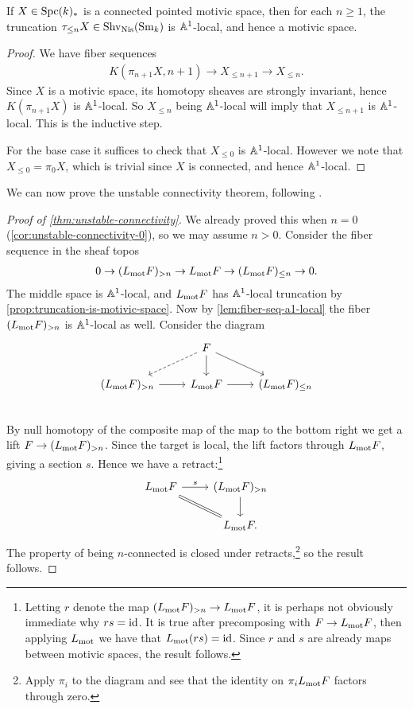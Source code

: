 \documentclass[11pt,openany]{book}
\begin{document}
\begin{proposition}\label{prop:truncation-is-motivic-space} 
\cite[1.8(2)]{bachmannstrongly}
If $X \in \mathrm{Spc}(k)_\ast$ is a connected pointed motivic space, then for each $n\ge 1$, the truncation $\tau_{\le n}X \in \mathrm{Shv}_{\mathrm{Nis}}(\mathrm{Sm}_k)$ is $\mathbb{A}^1$-local, and hence a motivic space.
\end{proposition}
\begin{proof} We have fiber sequences
\begin{align*}
    K(\pi_{n+1}X, n+1) \to X_{\le n+1} \to X_{\le n}.
\end{align*}
Since $X$ is a motivic space, its homotopy sheaves are strongly invariant, hence $K(\pi_{n+1} X)$ is $\mathbb{A}^1$-local. So $X_{\le n}$ being $\mathbb{A}^1$-local will imply that $X_{\le n+1}$ is $\mathbb{A}^1$-local. This is the inductive step.

For the base case it suffices to check that $X_{\le 0}$ is $\mathbb{A}^1$-local. However we note that $X_{\le 0} = \pi_0 X$, which is trivial since $X$ is connected, and hence $\mathbb{A}^1$-local.
\end{proof}



We can now prove the unstable connectivity theorem, following \cite[1.10]{bachmannstrongly}.

\begin{proof}[Proof of \autoref{thm:unstable-connectivity}] We already proved this when $n=0$ (\autoref{cor:unstable-connectivity-0}), so we may assume $n>0$. Consider the fiber sequence in the sheaf topos
\begin{align*}
    0 \to (L_{\mathrm{mot}} F)_{>n} \to L_{\mathrm{mot}} F \to (L_{\mathrm{mot}} F)_{\le n} \to 0.
\end{align*}
The middle space is $\mathbb{A}^1$-local, and $L_{\mathrm{mot}} F$ has $\mathbb{A}^1$-local truncation by \autoref{prop:truncation-is-motivic-space}. Now by \autoref{lem:fiber-seq-a1-local} the fiber $(L_{\mathrm{mot}} F)_{>n}$ is $\mathbb{A}^1$-local as well. Consider the diagram
\[ \begin{tikzcd}
     & F\dar\ar[dr]\ar[dl,dashed]\\
    (L_\mot F)_{>n}\rar & L_\mot F \rar & (L_\mot F)_{\le n}\\
\end{tikzcd} \]
By null homotopy of the composite map of the map to the bottom right we get a lift $F \to (L_{\mathrm{mot}} F)_{>n}$. Since the target is local, the lift factors through $L_{\mathrm{mot}} F$, giving a section $s$. Hence we have a retract:\footnote{%
Letting $r$ denote the map $(L_{\mathrm{mot}} F)_{>n} \to L_{\mathrm{mot}} F$, it is perhaps not obviously immediate why $rs = \mathrm{id}$. It is true after precomposing with $F \to L_{\mathrm{mot}} F$, then applying $L_{\mathrm{mot}}$ we have that $L_{\mathrm{mot}}(rs) = \mathrm{id}$. Since $r$ and $s$ are already maps between motivic spaces, the result follows.%
}
%
\[ \begin{tikzcd}
    L_\mot F\rar["s" above]\ar[dr,equal] & (L_\mot F)_{>n}\dar\\
     & L_\mot F.
\end{tikzcd} \]
The property of being $n$-connected is closed under retracts,\footnote{Apply $\pi_i$ to the diagram and see that the identity on $\pi_i L_{\mathrm{mot}} F$ factors through zero.} so the result follows.
\end{proof}
\end{document}
